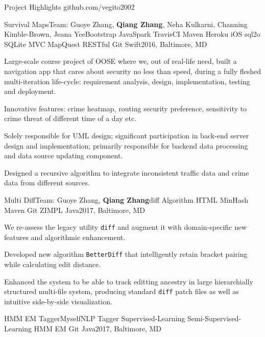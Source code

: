 \documentclass{resume} %
\begin{document}
\begin{rSection}{Project Highlights \faGithub\hspace{0.1cm} github.com/vegito2002}

\begin{rSubsection}{Survival Maps}{Team: Guoye Zhang, {\bf Qiang Zhang}, Neha Kulkarni, Channing Kimble-Brown, Jeana Yee}{Bootstrap JavaSpark TravisCI Maven Heroku iOS sql2o SQLite MVC MapQuest RESTful Git Swift}{2016, Baltimore, MD}
\item Large-scale course project of OOSE where we, out of real-life need, built a navigation app that cares about security no less than speed, during a fully fleshed multi-iteration life-cycle: requirement analysis, design, implementation, testing and deployment.
\item Innovative features: crime heatmap, routing security preference, sensitivity to crime threat of different time of a day etc.
\item Solely responsible for UML design; significant participation in back-end server design and implementation; primarily responsible for backend data processing and data source updating component.
\item Designed a recursive algorithm to integrate inconsistent traffic data and crime data from different sources.
\end{rSubsection}
\begin{rSubsection}{Multi Diff}{Team: Guoye Zhang, {\bf Qiang Zhang}}{diff Algorithm HTML MinHash Maven Git ZIMPL Java}{2017, Baltimore, MD}
\item We re-assess the legacy utility \texttt{diff} and augment it with domain-specific new features and algorithmic enhancement.
\item Developed new algorithm \texttt{BetterDiff} that intelligently retain bracket pairing while calculating edit distance.
\item Enhanced the system to be able to track editting ancestry in large hierarchially structured multi-file system, producing standard \texttt{diff} patch files as well as intuitive side-by-side visualization.
\end{rSubsection}
\begin{rSubsection}{HMM EM Tagger}{Myself}{NLP Tagger Supervised-Learning Semi-Supervised-Learning HMM EM Git Java}{2017, Baltimore, MD}

\end{rSubsection}
\end{rSection}
\end{document}
